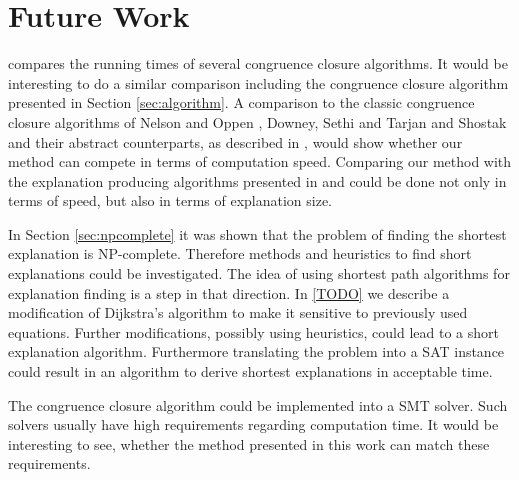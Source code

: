 \section*{Future Work}

\cite{Bachmair2000} compares the running times of several congruence closure algorithms.
It would be interesting to do a similar comparison including the congruence closure algorithm presented in Section \ref{sec:algorithm}.
A comparison to the classic congruence closure algorithms of Nelson and Oppen \cite{Nelson1980}, Downey, Sethi and Tarjan \cite{Downey1980} and Shostak \cite{Shostak1978} and their abstract counterparts, as described in \cite{Bachmair2000}, would show whether our method can compete in terms of computation speed.
Comparing our method with the explanation producing algorithms presented in \cite{Fontaine2004} and \cite{Nieuwenhuis2005,Nieuwenhuis2007} could be done not only in terms of speed, but also in terms of explanation size.

In Section \ref{sec:npcomplete} it was shown that the problem of finding the shortest explanation is NP-complete.
Therefore methods and heuristics to find short explanations could be investigated.
The idea of using shortest path algorithms for explanation finding is a step in that direction.
In \ref{TODO} we describe a modification of Dijkstra's algorithm \cite{TODO} to make it sensitive to previously used equations.
Further modifications, possibly using heuristics, could lead to a short explanation algorithm.
Furthermore translating the problem into a SAT instance could result in an algorithm to derive shortest explanations in acceptable time.

The congruence closure algorithm could be implemented into a SMT solver.
Such solvers usually have high requirements regarding computation time.
It would be interesting to see, whether the method presented in this work can match these requirements.
